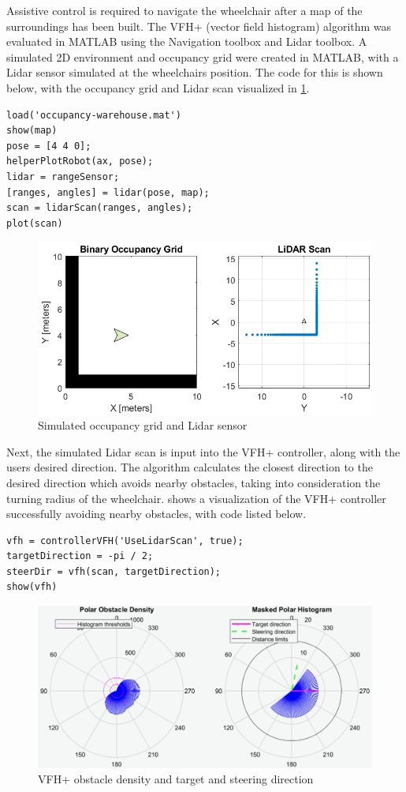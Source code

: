 \documentclass[12pt]{article}
\begin{document}
Assistive control is required to navigate the wheelchair after a map of the surroundings has been built.
The VFH+ (vector field histogram) \cite{ulrichVFHReliableObstacle1998} algorithm was evaluated
in MATLAB using the Navigation toolbox and Lidar toolbox.
A simulated 2D environment and occupancy grid were created in MATLAB,
with a Lidar sensor simulated at the wheelchairs position. The code for this is shown below,
with the occupancy grid and Lidar scan visualized in \cref{fig:simulated_lidar}.

\begin{verbatim}
load('occupancy-warehouse.mat')
show(map)
pose = [4 4 0];
helperPlotRobot(ax, pose);
lidar = rangeSensor;
[ranges, angles] = lidar(pose, map);
scan = lidarScan(ranges, angles);
plot(scan)
\end{verbatim}

\begin{figure}[H]
    \centering
    \includegraphics[width=0.5\linewidth]{images/simulated_lidar.png}
    \caption{Simulated occupancy grid and Lidar sensor}
    \label{fig:simulated_lidar}
\end{figure}

Next, the simulated Lidar scan is input into the VFH+ controller, along with
the users desired direction. The algorithm calculates the closest direction to the desired direction which
avoids nearby obstacles, taking into consideration the turning radius of the wheelchair.
 shows a visualization of the VFH+ controller successfully avoiding nearby
obstacles, with code listed below.

\begin{verbatim}
vfh = controllerVFH('UseLidarScan', true);
targetDirection = -pi / 2;
steerDir = vfh(scan, targetDirection);
show(vfh)
\end{verbatim}

\begin{figure}[H]
    \centering
    \includegraphics[width=0.5\linewidth]{images/vfh_controller.png}
    \caption{VFH+ obstacle density and target and steering direction}
    \label{fig:vfh_controller}
\end{figure}
\end{document}
